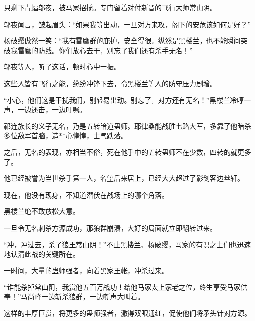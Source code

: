 \begin{this_body}
只剩下青蝠邬夜，被马家招揽。专门留着对付新晋的飞行大师常山阴。

邬夜闻言，皱起眉头：“如果我等出动，一旦对方来攻，阁下的安危该如何是好？”

杨破缨傲然一笑：“我有雷鹰群的庇护，安全得很。纵然是黑楼兰，也不能瞬间突破我雷鹰的防线。你们放心去干，别忘了我们还有杀手无名！”

邬夜等人，听了这话，顿时心中一振。

这些人皆有飞行之能，纷纷冲锋下去，令黑楼兰等人的防守压力剧增。

“小心，他们这是干扰我们，别轻易出动。别忘了，对方还有无名！”黑楼兰冷哼一声，一边还击，一边叮嘱。

祁连族长的义子无名，乃是五转暗道蛊师。耶律桑能战胜七路大军，多靠了他暗杀多位敌军首脑，造**心惶惶，士气跌落。

之后，无名的表现，亦相当不俗，死在他手中的五转蛊师不在少数，四转的就更多了。

他已经被誉为当世杀手第一人，名望后来居上，已经大大超过了影剑客边丝轩。

现在，他没有现身，不知道潜伏在战场上的哪个角落。

黑楼兰绝不敢放松大意。

一旦令无名刺杀方源成功，那狼群崩溃，大好的局面就立即翻转过来。

“冲，冲过去，杀了狼王常山阴！”不止黑楼兰、杨破缨，马家的有识之士们也迅速地认清此战的关键所在。

一时间，大量的蛊师强者，向着黑家王帐，冲杀过来。

“谁能杀掉常山阴，我赏他五百万战功！给他马家太上家老之位，终生享受马家供奉！”马尚峰一边斩杀狼群，一边嘶声大叫着。

这样的丰厚巨赏，将更多的蛊师强者，激得双眼通红，促使他们将矛头针对方源。

\end{this_body}

